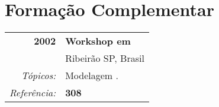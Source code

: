 \section{Formação Complementar}
\label{complementar}

\begin{center}
\begin{tabular}[t]{rl}
\textbf{2002}     & \textbf{Workshop em}\\
                  & Ribeirão SP, Brasil\\
\textit{Tópicos:} & Modelagem .\\
\textit{Referência:} & \textbf{308} 
\end{tabular}
\end{center}



